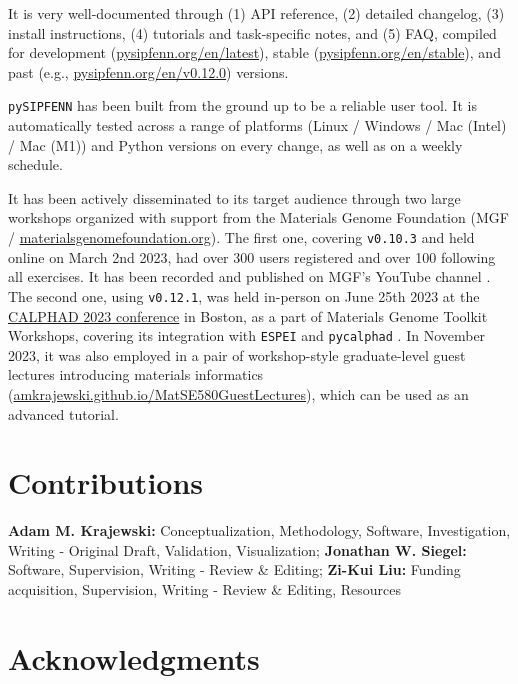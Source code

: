 It is very well-documented through (1) API reference, (2) detailed changelog, (3) install instructions, (4) tutorials and task-specific notes, and (5) FAQ, compiled for development (\href{https://pysipfenn.org/en/latest/}{pysipfenn.org/en/latest}), stable (\href{https://pysipfenn.org/en/stable/}{pysipfenn.org/en/stable}), and past (e.g., \href{https://pysipfenn.org/en/v0.12.0/}{pysipfenn.org/en/v0.12.0}) versions.

\texttt{pySIPFENN} has been built from the ground up to be a reliable user tool. It is automatically tested across a range of platforms (Linux / Windows / Mac (Intel) / Mac (M1)) and Python versions on every change, as well as on a weekly schedule.

It has been actively disseminated to its target audience through two large workshops organized with support from the Materials Genome Foundation (MGF / \href{https://materialsgenomefoundation.org}{materialsgenomefoundation.org}). The first one, covering \texttt{v0.10.3} and held online on March 2nd 2023, had over 300 users registered and over 100 following all exercises. It has been recorded and published on MGF's YouTube channel \cite{Krajewski20232023YouTube}. The second one, using \texttt{v0.12.1}, was held in-person on June 25th 2023 at the \href{https://calphad.org/calphad-2023}{CALPHAD 2023 conference} in Boston, as a part of Materials Genome Toolkit Workshops, covering its integration with \texttt{ESPEI} \cite{Bocklund2019ESPEICuMg} and \texttt{pycalphad} \cite{Otis2017Pycalphad:Python}. In November 2023, it was also employed in a pair of workshop-style graduate-level guest lectures introducing materials informatics (\href{https://amkrajewski.github.io/MatSE580GuestLectures/}{amkrajewski.github.io/MatSE580GuestLectures}), which can be used as an advanced tutorial.


\section*{Contributions}
\textbf{Adam M. Krajewski:} Conceptualization, Methodology, Software, Investigation, Writing - Original Draft, Validation, Visualization;
\textbf{Jonathan W. Siegel:} Software, Supervision, Writing - Review \& Editing;
\textbf{Zi-Kui Liu:} Funding acquisition, Supervision, Writing - Review \& Editing, Resources

\section*{Acknowledgments}

